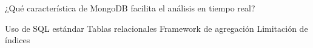 \question[1] ¿Qué característica de MongoDB facilita el análisis en tiempo real?
\begin{choices}
\choice Uso de SQL estándar
\choice Tablas relacionales
\CorrectChoice Framework de agregación
\choice Limitación de índices
\end{choices}